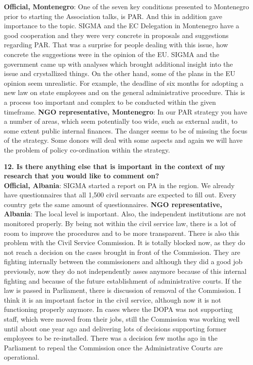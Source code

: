 \textbf{Official, Montenegro}: One of the seven key conditions presented to Montenegro prior to starting the Association talks, is PAR. And this in addition gave importance to the topic. SIGMA and the EC Delegation in Montenegro have a good cooperation and they were very concrete in proposals and suggestions regarding PAR. That was a surprise for people dealing with this issue, how concrete the suggestions were in the opinion of the EU. SIGMA and the government came up with analyses which brought additional insight into the issue and crystallized things. On the other hand, some of the plans in the EU opinion seem unrealistic. For example, the deadline of six months for adopting a new law on state employees and on the general administrative procedure. This is a process too important and complex to be conducted within the given timeframe.
\textbf{NGO representative, Montenegro}: In our PAR strategy you have a number of areas, which seem potentially too wide, such as external audit, to some extent public internal finances. The danger seems to be of missing the focus of the strategy. Some donors will deal with some aspects and again we will have the problem of policy co-ordination within the strategy. \newpage
\textbf{12. Is there anything else that is important in the context of my research that you would like to comment on?}\\
\textbf{Official, Albania}: SIGMA started a report on PA in the region. We already have questionnaires that all 1,500 civil servants are expected to fill out. Every country gets the same amount of questionnaires. 
\textbf{NGO representative, Albania}: The local level is important. Also, the independent institutions are not monitored properly. By being not within the civil service law, there is a lot of room to improve the procedures and to be more transparent. There is also this problem with the Civil Service Commission. It is totally blocked now, as they do not reach a decision on the cases brought in front of the Commission. They are fighting internally between the commissioners and although they did a good job previously, now they do not independently asses anymore because of this internal fighting and because of the future establishment of administrative courts. If the law is passed in Parliament, there is discussion of removal of the Commission. I think it is an important factor in the civil service, although now it is not functioning properly anymore. In cases where the DOPA was not supporting staff, which were moved from their jobs, still the Commission was working well until about one year ago and delivering lots of decisions supporting former employees to be re-installed. There was a decision few moths ago in the Parliament to repeal the Commission once the Administrative Courts are operational. 
